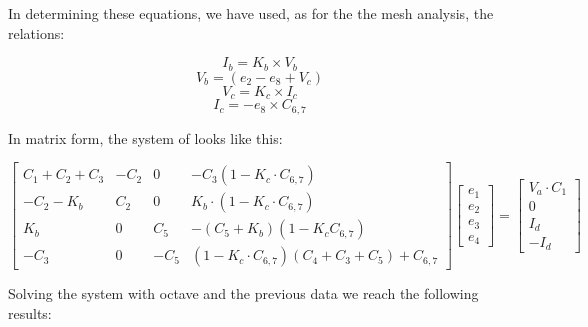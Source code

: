 In determining these equations, we have used, as for the the mesh analysis, the relations:


\begin{equation*}
    I_b = K_b \times V_b
\end{equation*}
\begin{equation*}
    V_b = (e_2 - e_8 + V_c)
\end{equation*}
\begin{equation*}
    V_c = K_c \times I_c
\end{equation*}
\begin{equation*}
    I_c = -e_8 \times C_{6,7}
\end{equation*}

In matrix form, the system of looks like this:
\vspace{10mm}


$\begin{bmatrix}
C_1 + C_2 + C_3  &  -C_2                 &  0        &  -C_3(1-K_c \cdot C_{6,7}) \\
-C_2 - K_b        &  C_2      &  0           &  K_b \cdot (1 - K_c \cdot C_{6,7}) \\
K_b             & 0                     &  C_5
&  -(C_5 + K_b)(1 - K_c C_{6,7}) \\
-C_3 & 0 & -C_5 & (1-K_c \cdot C_{6,7})(C_4 + C_3 + C_5) + C_{6,7}
\end{bmatrix}
\begin{bmatrix}
e_1 \\
e_2 \\
e_3 \\
e_4
\end{bmatrix}
=
\begin{bmatrix}
V_a \cdot C_1 \\
0 \\
I_d \\
-I_d
\end{bmatrix}$

\vspace{10mm}

Solving the system with octave and the previous data we reach the following results:
 